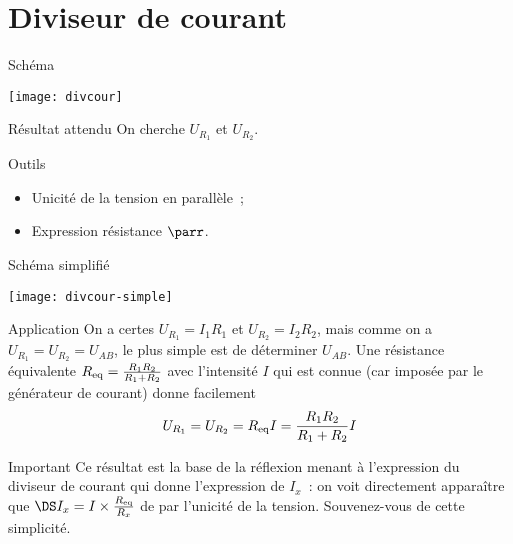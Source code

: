 \documentclass[a4paper, 12pt, final, garamond]{book}
\begin{document}
\section{Diviseur de courant}
\begin{tcbraster}[raster columns=3, raster equal height=rows]
    \begin{NCdefi}{Schéma}
        \begin{center}
            \texttt{[image: divcour]}
        \end{center}
    \end{NCdefi}
    \begin{tcolorbox}[blankest, raster multicolumn=1, space to=\myspace]
        \begin{tcbraster}[raster columns=1]
            \begin{NCprop}{Résultat attendu}
                On cherche $U_{R_1}$ et $U_{R_2}$.
            \end{NCprop}
            \begin{NCrapp}[add to natural height=\myspace]{Outils}
                \begin{itemize}
                    \item Unicité de la tension en parallèle~;
                    \item Expression résistance $\parr$.
                \end{itemize}
            \end{NCrapp}
        \end{tcbraster}
    \end{tcolorbox}
    \begin{NCinte}{Schéma simplifié}
        \begin{center}
            \texttt{[image: divcour-simple]}
        \end{center}
    \end{NCinte}
\end{tcbraster}
\begin{tcbraster}[raster columns=2, raster equal height=rows]
    \begin{NCexem}{Application}
        On a certes $U_{R_1} = I_1R_1$ et $U_{R_2} = I_2R_2$, mais comme on a
        $U_{R_1} = U_{R_2} = U_{AB}$, le plus simple est de déterminer $U_{AB}$.
        Une résistance équivalente $R_{\rm eq} = \frac{R_1R_2}{R_1+R_2}$ avec
        l'intensité $I$ qui est connue (car imposée par le générateur de
        courant) donne facilement \[U_{R_1} = U_{R_2} = R_{\rm eq}I =
        \frac{R_1R_2}{R_1+R_2}I\]
    \end{NCexem}
    \begin{NCror}{Important}
        Ce résultat est la base de la réflexion menant à l'expression du
        diviseur de courant qui donne l'expression de $I_x$~: on voit
        directement apparaître que $\DS I_x = I\times\frac{R_{\rm eq}}{R_x}$ de par
        l'unicité de la tension. Souvenez-vous de cette simplicité.
    \end{NCror}
\end{tcbraster}
\end{document}
